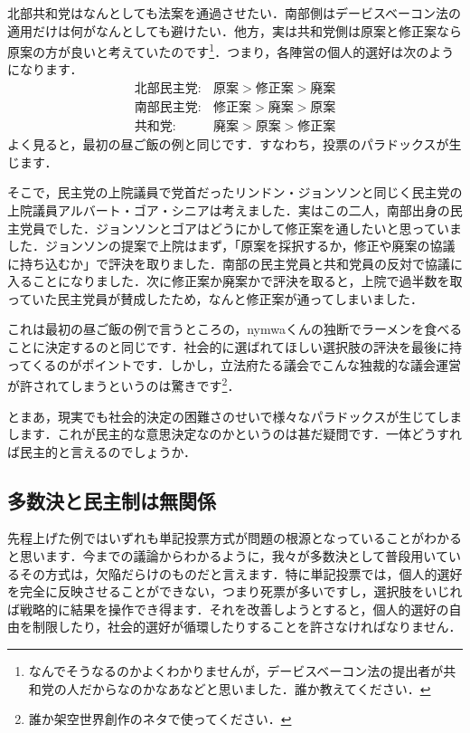 北部共和党はなんとしても法案を通過させたい．南部側はデービスベーコン法の適用だけは何がなんとしても避けたい．他方，実は共和党側は原案と修正案なら原案の方が良いと考えていたのです\footnote{なんでそうなるのかよくわかりませんが，デービスベーコン法の提出者が共和党の人だからなのかなあなどと思いました．誰か教えてください．}．つまり，各陣営の個人的選好は次のようになります．
\begin{align*}
    北部民主党 :&　 原案 > 修正案 > 廃案 \\
    南部民主党 :&　 修正案 > 廃案 > 原案 \\
    共和党     :&　 廃案 > 原案 > 修正案
\end{align*}
よく見ると，最初の昼ご飯の例と同じです．すなわち，投票のパラドックスが生じます．

そこで，民主党の上院議員で党首だったリンドン・ジョンソンと同じく民主党の上院議員アルバート・ゴア・シニアは考えました．実はこの二人，南部出身の民主党員でした．ジョンソンとゴアはどうにかして修正案を通したいと思っていました．ジョンソンの提案で上院はまず，「原案を採択するか，修正や廃案の協議に持ち込むか」で評決を取りました．南部の民主党員と共和党員の反対で協議に入ることになりました．次に修正案か廃案かで評決を取ると，上院で過半数を取っていた民主党員が賛成したため，なんと修正案が通ってしまいました．

これは最初の昼ご飯の例で言うところの，nymwaくんの独断でラーメンを食べることに決定するのと同じです．社会的に選ばれてほしい選択肢の評決を最後に持ってくるのがポイントです．しかし，立法府たる議会でこんな独裁的な議会運営が許されてしまうというのは驚きです\footnote{誰か架空世界創作のネタで使ってください．}．

とまあ，現実でも社会的決定の困難さのせいで様々なパラドックスが生じてしまします．これが民主的な意思決定なのかというのは甚だ疑問です．一体どうすれば民主的と言えるのでしょうか．

\subsection{多数決と民主制は無関係}
先程上げた例ではいずれも単記投票方式が問題の根源となっていることがわかると思います．今までの議論からわかるように，我々が多数決として普段用いているその方式は，欠陥だらけのものだと言えます．特に単記投票では，個人的選好を完全に反映させることができない，つまり死票が多いですし，選択肢をいじれば戦略的に結果を操作でき得ます．それを改善しようとすると，個人的選好の自由を制限したり，社会的選好が循環したりすることを許さなければなりません．

